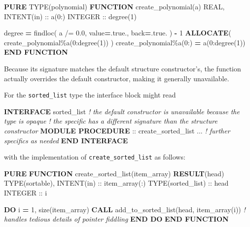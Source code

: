 \documentclass[
]{article}
\newenvironment{Shaded}{}{}
\newcommand{\CommentTok}[1]{\textcolor[rgb]{0.38,0.63,0.69}{\textit{#1}}}
\newcommand{\ConstantTok}[1]{\textcolor[rgb]{0.53,0.00,0.00}{#1}}
\newcommand{\DataTypeTok}[1]{\textcolor[rgb]{0.56,0.13,0.00}{#1}}
\newcommand{\DecValTok}[1]{\textcolor[rgb]{0.25,0.63,0.44}{#1}}
\newcommand{\FloatTok}[1]{\textcolor[rgb]{0.25,0.63,0.44}{#1}}
\newcommand{\FunctionTok}[1]{\textcolor[rgb]{0.02,0.16,0.49}{#1}}
\newcommand{\KeywordTok}[1]{\textcolor[rgb]{0.00,0.44,0.13}{\textbf{#1}}}
\newcommand{\NormalTok}[1]{#1}
\newcommand{\OperatorTok}[1]{\textcolor[rgb]{0.40,0.40,0.40}{#1}}
\begin{document}
\begin{Shaded}
\begin{Highlighting}[]
\KeywordTok{PURE} \DataTypeTok{TYPE(polynomial)} \KeywordTok{FUNCTION}\NormalTok{ create\_polynomial(a)}
   \DataTypeTok{REAL}\NormalTok{, }\DataTypeTok{INTENT(in)} \DataTypeTok{::}\NormalTok{ a(}\DecValTok{0}\NormalTok{:)}
   \DataTypeTok{INTEGER} \DataTypeTok{::}\NormalTok{ degree(}\DecValTok{1}\NormalTok{)}

\NormalTok{   degree }\KeywordTok{=} \FunctionTok{findloc}\NormalTok{( a }\OperatorTok{/=} \FloatTok{0.0}\NormalTok{, }\DataTypeTok{value}\KeywordTok{=}\ConstantTok{.true.}\NormalTok{, back}\KeywordTok{=}\ConstantTok{.true.}\NormalTok{ ) }\KeywordTok{{-}} \DecValTok{1}
   \KeywordTok{ALLOCATE}\NormalTok{( create\_polynomial}\OperatorTok{\%}\NormalTok{a(}\DecValTok{0}\NormalTok{:degree(}\DecValTok{1}\NormalTok{)) )}
\NormalTok{   create\_polynomial}\OperatorTok{\%}\NormalTok{a(}\DecValTok{0}\NormalTok{:) }\KeywordTok{=}\NormalTok{ a(}\DecValTok{0}\NormalTok{:degree(}\DecValTok{1}\NormalTok{))}
\KeywordTok{END FUNCTION}
\end{Highlighting}
\end{Shaded}

Because its signature matches the default structure constructor's, the
function actually overrides the default constructor, making it generally
unavailable.

For the \texttt{sorted\_list} type the interface block might read

\begin{Shaded}
\begin{Highlighting}[]
\KeywordTok{INTERFACE}\NormalTok{ sorted\_list}
\CommentTok{! the default constructor is unavailable because the type is opaque}
\CommentTok{! the specific has a different signature than the structure constructor}
   \KeywordTok{MODULE PROCEDURE} \DataTypeTok{::}\NormalTok{ create\_sorted\_list}
\NormalTok{   ... }\CommentTok{! further specifics as needed}
\KeywordTok{END INTERFACE}
\end{Highlighting}
\end{Shaded}

with the implementation of \texttt{create\_sorted\_list} as follows:

\begin{Shaded}
\begin{Highlighting}[]
\KeywordTok{PURE} \KeywordTok{FUNCTION}\NormalTok{ create\_sorted\_list(item\_array) }\KeywordTok{RESULT}\NormalTok{(head)}
   \DataTypeTok{TYPE(sortable)}\NormalTok{, }\DataTypeTok{INTENT(in)} \DataTypeTok{::}\NormalTok{ item\_array(:)}
   \DataTypeTok{TYPE(sorted\_list)} \DataTypeTok{::}\NormalTok{ head}
   \DataTypeTok{INTEGER} \DataTypeTok{::}\NormalTok{ i}

   \KeywordTok{DO}\NormalTok{ i }\KeywordTok{=} \DecValTok{1}\NormalTok{, }\FunctionTok{size}\NormalTok{(item\_array)}
      \KeywordTok{CALL}\NormalTok{ add\_to\_sorted\_list(head, item\_array(i))}
      \CommentTok{! handles tedious details of pointer fiddling}
   \KeywordTok{END DO}
\KeywordTok{END FUNCTION}
\end{Highlighting}
\end{Shaded}
\end{document}
